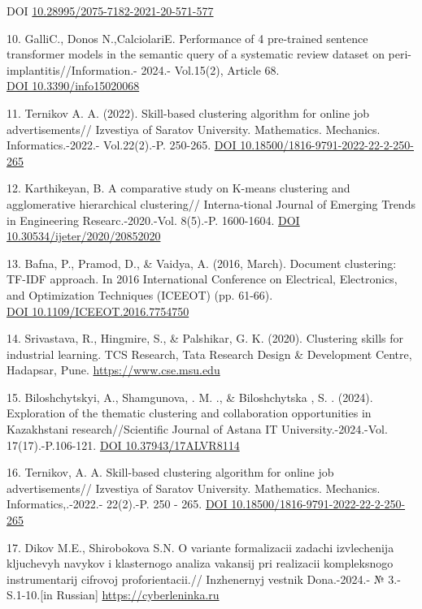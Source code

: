 \begin{references}
DOI
\href{http://dx.doi.org/10.28995/2075-7182-2021-20-571-577}{10.28995/2075-7182-2021-20-571-577}

10. GalliC., Donos N.,CalciolariE. Performance of 4 pre-trained sentence
transformer models in the semantic query of a systematic review
dataset on peri-implantitis//Information.- 2024.- Vol.15(2), Article
68. \\\href{https://doi.org/10.3390/info15020068}{DOI
10.3390/info15020068}

11. Ternikov A. A. (2022). Skill-based clustering algorithm for online job
advertisements// Izvestiya of Saratov University. Mathematics.
Mechanics. Informatics.-2022.- Vol.22(2).-P. 250-265.
\href{https://doi.org/10.18500/1816-9791-2022-22-2-250-265}{DOI
10.18500/1816-9791-2022-22-2-250-265}

12. Karthikeyan, B. A comparative study on K-means clustering and
agglomerative hierarchical clustering// Interna-tional Journal of
Emerging Trends in Engineering Researc.-2020.-Vol. 8(5).-P. 1600-1604.
\href{https://doi.org/10.30534/ijeter/2020/20852020}{DOI
\\10.30534/ijeter/2020/20852020}

13. Bafna, P., Pramod, D., \& Vaidya, A. (2016, March). Document
clustering: TF-IDF approach. In 2016 International Conference on
Electrical, Electronics, and Optimization Techniques (ICEEOT) (pp.
61-66). \\\href{https://doi.org/10.1109/ICEEOT.2016.7754750}{DOI
10.1109/ICEEOT.2016.7754750}

14. Srivastava, R., Hingmire, S., \& Palshikar, G. K. (2020). Clustering
skills for industrial learning. TCS Research, Tata Research Design \&
Development Centre, Hadapsar, Pune.
\href{https://www.cse.msu.edu/~wangzh65/AI4EDU/papers/15.pdf}{https://www.cse.msu.edu}

15. Biloshchytskyi, A., Shamgunova, . M. ., \& Biloshchytska , S. .
(2024). Exploration of the thematic clustering and collaboration
opportunities in Kazakhstani research//Scientific Journal of Astana IT
University.-2024.-Vol. 17(17).-P.106-121.
\href{https://doi.org/10.37943/17ALVR8114}{DOI 10.37943/17ALVR8114}

16. Ternikov, A. A. Skill-based clustering algorithm for online job
advertisements// Izvestiya of Saratov University. Mathematics.
Mechanics. Informatics,.-2022.- 22(2).-P. 250 - 265.
\href{https://doi.org/10.18500/1816-9791-2022-22-2-250-265}{DOI
10.18500/1816-9791-2022-22-2-250-265}

17. Dikov M.E., Shirobokova S.N. O variante formalizacii zadachi
izvlechenija kljuchevyh navykov i klasternogo analiza vakansij pri
realizacii kompleksnogo instrumentarij cifrovoj proforientacii.//
Inzhenernyj vestnik Dona.-2024.- № 3.- S.1-10.{[}in Russian{]}
\href{https://cyberleninka.ru/article/n/o-variante-formalizatsii-zadachi-izvlecheniya-klyuchevyh-navykov-i-klasternogo-analiza-vakansiy-pri-realizatsii-kompleksnogo}{https://cyberleninka.ru}
\end{references}

